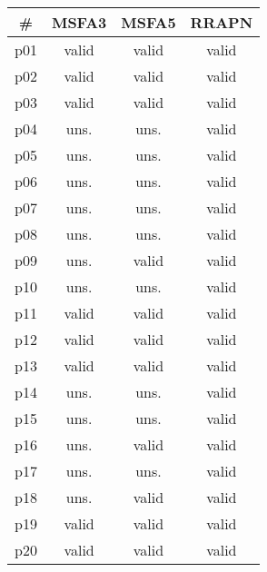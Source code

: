 \begin{tabular}{cccc}
\toprule
\textbf{\#} & \textbf{MSFA3} & \textbf{MSFA5} & \textbf{RRAPN}\\
\midrule
p01 & valid & valid & valid\\
p02 & valid & valid & valid\\
p03 & valid & valid & valid\\
p04 & uns. & uns. & valid\\
p05 & uns. & uns. & valid\\
p06 & uns. & uns. & valid\\
p07 & uns. & uns. & valid\\
p08 & uns. & uns. & valid\\
p09 & uns. & valid & valid\\
p10 & uns. & uns. & valid\\
p11 & valid & valid & valid\\
p12 & valid & valid & valid\\
p13 & valid & valid & valid\\
p14 & uns. & uns. & valid\\
p15 & uns. & uns. & valid\\
p16 & uns. & valid & valid\\
p17 & uns. & uns. & valid\\
p18 & uns. & valid & valid\\
p19 & valid & valid & valid\\
p20 & valid & valid & valid\\
\bottomrule
\end{tabular}

